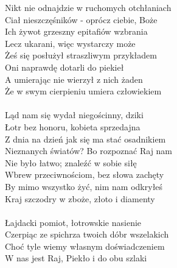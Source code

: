 \documentclass[a5paper, 10pt]{book}
\begin{document}
\newpage
\begin{minipage}[t]{0.7\textwidth}

\hspace*{4mm} Nikt nie odnajdzie w ruchomych otchłaniach\\
\hspace*{4mm} Ciał nieszczęśników - oprócz ciebie, Boże\\
\hspace*{4mm} Ich żywot grzeszny epitafiów wzbrania\\
\hspace*{4mm} Lecz ukarani, więc wystarczy może\\
\hspace*{4mm} Żeś się posłużył straszliwym przykładem\\
\hspace*{4mm} Oni naprawdę dotarli do piekieł\\
\hspace*{4mm} A umierając nie wierzył z nich żaden\\
\hspace*{4mm} Że w swym cierpieniu umiera człowiekiem\\
\\

Ląd nam się wydał niegościnny, dziki\\
Łotr bez honoru, kobieta sprzedajna\\
Z dnia na dzień jak się ma stać osadnikiem\\
Nieznanych światów? Bo rozpoznać Raj nam\\
Nie było łatwo; znaleźć w sobie siłę\\
Wbrew przeciwnościom, bez słowa zachęty\\
By mimo wszystko żyć, nim nam odkryłeś\\
Kraj szczodry w zboże, złoto i diamenty\\
\\

\hspace*{4mm} Łajdacki pomiot, łotrowskie nasienie\\
\hspace*{4mm} Czerpiąc ze spichrza twoich dóbr wszelakich\\
\hspace*{4mm} Choć tyle wiemy własnym doświadczeniem\\
\hspace*{4mm} W nas jest Raj, Piekło i do obu szlaki\\
\\
\end{minipage}
\end{document}
